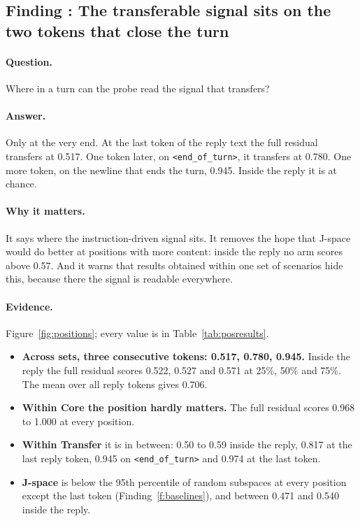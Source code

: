 \documentclass[11pt]{article}
\newcommand{\eot}{\texttt{<end\_of\_turn>}}
\newcounter{finding}
\newcommand{\findingbreak}{}
\begin{document}
\findingbreak
{}\label{f:position}
\subsection{Finding \thefinding: The transferable signal sits on the two tokens that close the turn}

\paragraph{Question.} Where in a turn can the probe read the signal that transfers?

\paragraph{Answer.} Only at the very end. At the last token of the reply text the full residual transfers at 0.517. One
token later, on \eot, it transfers at 0.780. One more token, on the newline that ends the turn, 0.945. Inside the reply it
is at chance.

\paragraph{Why it matters.} It says where the instruction-driven signal sits. It removes the hope that J-space would do
better at positions with more content: inside the reply no arm scores above 0.57. And it warns that results obtained within
one set of scenarios hide this, because there the signal is readable everywhere.

\paragraph{Evidence.} Figure~\ref{fig:positions}; every value is in Table~\ref{tab:posresults}.
\begin{itemize}
\item \textbf{Across sets, three consecutive tokens: 0.517, 0.780, 0.945.} Inside the reply the full residual scores 0.522,
0.527 and 0.571 at 25\%, 50\% and 75\%. The mean over all reply tokens gives 0.706.
\item \textbf{Within Core the position hardly matters.} The full residual scores 0.968 to 1.000 at every position.
\item \textbf{Within Transfer} it is in between: 0.50 to 0.59 inside the reply, 0.817 at the last reply token, 0.945 on
\eot{} and 0.974 at the last token.
\item \textbf{J-space} is below the 95th percentile of random subspaces at every position except the last token
(Finding~\ref{f:baselines}), and between 0.471 and 0.540 inside the reply.
\end{itemize}
\end{document}
